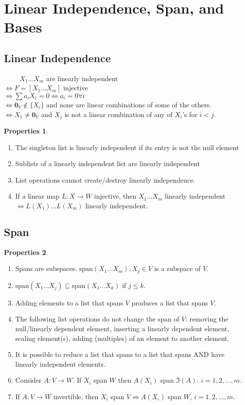 \documentclass{book}
\theoremstyle{definition}
\newtheorem{prop}{Properties}[section]
\newcommand{\xpan}{\text{span}}
\begin{document}
\section{Linear Independence, Span, and Bases}
\subsection{Linear Independence}
$\,\,\,\,\,\,\,\,\,\,\,\,\,\,X_1\dots X_m$ are linearly independent\\
$\iff F = [X_1 \dots X_m]$ injective\\
$\iff \sum a_iX_i = 0 \iff a_i = 0 \forall i$\\
$\iff \mathbf{0}_V \notin \{X_i\}$ and none are linear combinations of some of the others.\\
$\iff X_1 \neq \mathbf{0}_V$ and $X_j$ is not a linear combination of any of $X_i$'s for $i < j$. 
\begin{prop}
	$\,$
	\begin{enumerate}
		\item The singleton list is linearly independent if its entry is not the null element
		\item Sublists of a linearly independent list are linearly independent
		\item List operations cannot create/destroy linearly independence. 
		\item If a linear map $L : X \rightarrow W$ injective, then $X_1\dots X_m$ linearly independent $\iff L(X_1)\dots L(X_m)$ linearly independent.  
	\end{enumerate}
\end{prop}
\subsection{Span}
\begin{prop}
	$\,$
	\begin{enumerate}
		\item Spans are subspaces. $\xpan(X_1\dots X_m), X_j \in V$ is a subspace of $V$.
		\item $\xpan(X_1\dots X_j) \subseteq \xpan(X_1\dots X_k)$ if $j\leq k$.
		\item Adding elements to a list that spans $V$ produces a list that spans $V$.
		\item The following list operations do not change the span of $V$: removing the null/linearly dependent element, inserting a linearly dependent element, scaling element(s), adding (multiples) of an element to another element.
		\item It is possible to reduce a list that spans to a list that spans AND have linearly independent elements.
		\item Consider $A : V \rightarrow W$. If $X_i$ span $W$ then $A(X_i)$ span $\Im(A)$. $i=1,2,\dots,m$.
		\item If $A : V \rightarrow W$ invertible, then $X_i$ span $V \iff A(X_i)$ span $W$, $i=1,2,\dots,m$. 
	\end{enumerate}
\end{prop}
\end{document}
